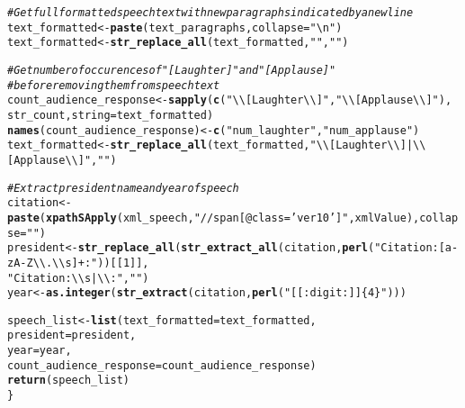 \documentclass{article}\usepackage[]{graphicx}\usepackage[]{color}
\makeatletter
\newcommand{\hlnum}[1]{\textcolor[rgb]{0.686,0.059,0.569}{#1}}%
\newcommand{\hlstr}[1]{\textcolor[rgb]{0.192,0.494,0.8}{#1}}%
\newcommand{\hlcom}[1]{\textcolor[rgb]{0.678,0.584,0.686}{\textit{#1}}}%
\newcommand{\hlstd}[1]{\textcolor[rgb]{0.345,0.345,0.345}{#1}}%
\newcommand{\hlkwb}[1]{\textcolor[rgb]{0.69,0.353,0.396}{#1}}%
\newcommand{\hlkwc}[1]{\textcolor[rgb]{0.333,0.667,0.333}{#1}}%
\newcommand{\hlkwd}[1]{\textcolor[rgb]{0.737,0.353,0.396}{\textbf{#1}}}%
\newenvironment{kframe}{%
 \def\at@end@of@kframe{}%
 \ifinner\ifhmode%
  \def\at@end@of@kframe{\end{minipage}}%
  \begin{minipage}{\columnwidth}%
 \fi\fi%
 \def\FrameCommand##1{\hskip\@totalleftmargin \hskip-\fboxsep
 \colorbox{shadecolor}{##1}\hskip-\fboxsep
     \hskip-\linewidth \hskip-\@totalleftmargin \hskip\columnwidth}%
 \MakeFramed {\advance\hsize-\width
   \@totalleftmargin\z@ \linewidth\hsize
   \@setminipage}}%
 {\par\unskip\endMakeFramed%
 \at@end@of@kframe}
\newenvironment{knitrout}{}{} %
\makeatother
\begin{document}
\begin{knitrout}
\begin{kframe}
\begin{alltt}
  \hlcom{# Get full formatted speech text with new paragraphs indicated by a new line}
  \hlstd{text_formatted} \hlkwb{<-} \hlkwd{paste}\hlstd{(text_paragraphs,} \hlkwc{collapse} \hlstd{=} \hlstr{" \textbackslash{}n"}\hlstd{)}
  \hlstd{text_formatted} \hlkwb{<-} \hlkwd{str_replace_all}\hlstd{(text_formatted,} \hlstr{"  "}\hlstd{,} \hlstr{" "}\hlstd{)}

  \hlcom{# Get number of occurences of "[Laughter]" and "[Applause]" }
  \hlcom{# before removing them from speech text}
  \hlstd{count_audience_response} \hlkwb{<-} \hlkwd{sapply}\hlstd{(}\hlkwd{c}\hlstd{(}\hlstr{"\textbackslash{}\textbackslash{}[Laughter\textbackslash{}\textbackslash{}]"}\hlstd{,} \hlstr{"\textbackslash{}\textbackslash{}[Applause\textbackslash{}\textbackslash{}]"}\hlstd{),}
                                    \hlstd{str_count,} \hlkwc{string} \hlstd{= text_formatted)}
  \hlkwd{names}\hlstd{(count_audience_response)} \hlkwb{<-} \hlkwd{c}\hlstd{(}\hlstr{"num_laughter"}\hlstd{,} \hlstr{"num_applause"}\hlstd{)}
  \hlstd{text_formatted} \hlkwb{<-} \hlkwd{str_replace_all}\hlstd{(text_formatted,} \hlstr{" \textbackslash{}\textbackslash{}[Laughter\textbackslash{}\textbackslash{}]| \textbackslash{}\textbackslash{}[Applause\textbackslash{}\textbackslash{}]"}\hlstd{,} \hlstr{""}\hlstd{)}

  \hlcom{# Extract president name and year of speech}
  \hlstd{citation} \hlkwb{<-} \hlkwd{paste}\hlstd{(}\hlkwd{xpathSApply}\hlstd{(xml_speech,} \hlstr{"//span[@class='ver10']"}\hlstd{, xmlValue),} \hlkwc{collapse} \hlstd{=} \hlstr{""}\hlstd{)}
  \hlstd{president} \hlkwb{<-} \hlkwd{str_replace_all}\hlstd{(}\hlkwd{str_extract_all}\hlstd{(citation,} \hlkwd{perl}\hlstd{(}\hlstr{"Citation:[a-zA-Z\textbackslash{}\textbackslash{}.\textbackslash{}\textbackslash{}s]+:"}\hlstd{))[[}\hlnum{1}\hlstd{]],}
                               \hlstr{"Citation:\textbackslash{}\textbackslash{}s|\textbackslash{}\textbackslash{}:"}\hlstd{,} \hlstr{""}\hlstd{)}
  \hlstd{year} \hlkwb{<-} \hlkwd{as.integer}\hlstd{(}\hlkwd{str_extract}\hlstd{(citation,} \hlkwd{perl}\hlstd{(}\hlstr{"[[:digit:]]\{4\}"}\hlstd{)))}

  \hlstd{speech_list} \hlkwb{<-} \hlkwd{list}\hlstd{(}\hlkwc{text_formatted} \hlstd{= text_formatted,}
                      \hlkwc{president} \hlstd{= president,}
                      \hlkwc{year} \hlstd{= year,}
                      \hlkwc{count_audience_response} \hlstd{= count_audience_response)}
  \hlkwd{return}\hlstd{(speech_list)}
\hlstd{\}}


\end{alltt}
\end{kframe}
\end{knitrout}
\end{document}
